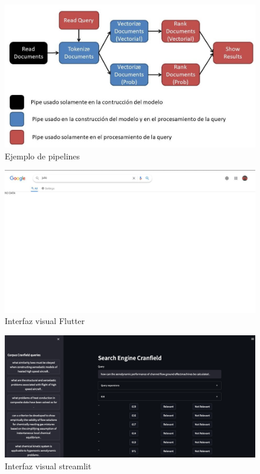 \documentclass[runningheads]{llncs}
\begin{document}
\begin{figure}
\includegraphics[width=\textwidth]{pipeline.jpg}
\caption{Ejemplo de pipelines} \label{pipeline_fig}
\end{figure}

\begin{figure}
\includegraphics[width=\textwidth]{ui.jpg}
\caption{Interfaz visual Flutter} \label{ui_fig}
\end{figure}
    
\begin{figure}
    \includegraphics[width=\textwidth]{ui_streamlit.png}
    \caption{Interfaz visual streamlit} \label{ui_streamlit_fig}
\end{figure}
\end{document}
